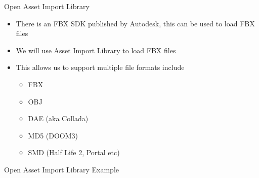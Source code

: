 \begin{frame}{Open Asset Import Library}
	\begin{itemize}
		\item There is an FBX SDK published by Autodesk, this can be used to load FBX files
		\pause\item We will use Asset Import Library to load FBX files
		\pause\item This allows us to support multiple file formats include
		\begin{itemize}
			\pause\item FBX
			\pause\item OBJ 
			\pause\item DAE (aka Collada)
			\pause\item MD5 (DOOM3)
			\pause\item SMD (Half Life 2, Portal etc)
		\end{itemize}
	\end{itemize}
\end{frame}

\begin{frame}
	\begin{center}
		Open Asset Import Library Example
	\end{center}
\end{frame}